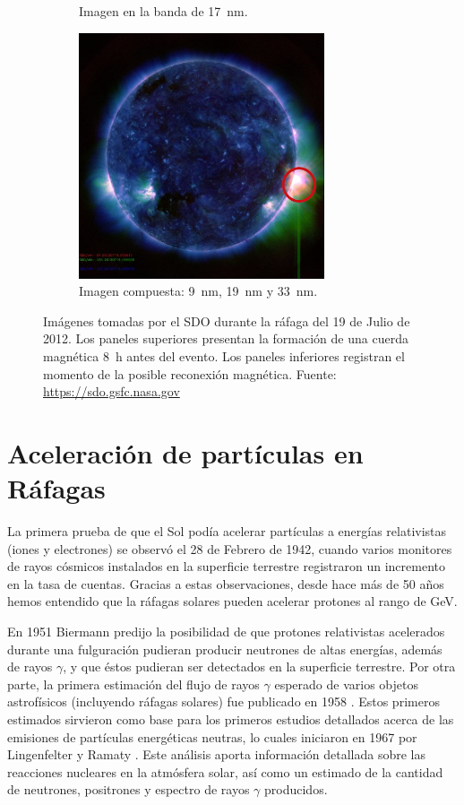 \begin{figure}
\begin{subfigure}[b]{0.49\textwidth}
                \caption*{Imagen en la banda de \SI{17}{\nano\metre}.}
        \end{subfigure}
        \begin{subfigure}[b]{0.49\textwidth}
                \includegraphics[width=7.25cm]{sdo120719-0555-c}
                \caption*{Imagen compuesta: \SI{9}{\nano\metre}, \SI{19}{\nano\metre} y \SI{33}{\nano\metre}.}
        \end{subfigure}
        \caption{Imágenes tomadas por el SDO durante la ráfaga del \num{19} de Julio de \num{2012}. Los paneles superiores presentan la formación de una cuerda magnética \SI{8}{\hour} antes del evento. Los paneles inferiores registran el momento de la posible reconexión magnética. Fuente: \url{https://sdo.gsfc.nasa.gov}}
        \label{fig:flare-euv}
\end{figure}

\section{Aceleración de partículas en Ráfagas}
\label{sec:acel-part}

La primera prueba de que el Sol podía acelerar partículas a energías relativistas (iones y electrones) se observó el \num{28} de Febrero de \num{1942}, cuando varios monitores de rayos cósmicos instalados en la superficie terrestre registraron un incremento en la tasa de cuentas. Gracias a estas observaciones, desde hace más de \num{50} años hemos entendido que la ráfagas solares pueden acelerar protones al rango de \si{\giga\electronvolt}.

En \num{1951} Biermann \cite{bierman51} predijo la posibilidad de que protones relativistas acelerados durante una fulguración pudieran producir neutrones de altas energías, además de rayos $\gamma$, y que éstos pudieran ser detectados en la superficie terrestre. Por otra parte, la primera estimación del flujo de rayos $\gamma$ esperado de varios objetos astrofísicos (incluyendo ráfagas solares) fue publicado en \num{1958} \cite{morrison58}. Estos primeros estimados sirvieron como base para los primeros estudios detallados acerca de las emisiones de partículas energéticas neutras, lo cuales iniciaron en \num{1967} por Lingenfelter y Ramaty \cite{lingen67}. Este análisis aporta información detallada sobre las reacciones nucleares en la atmósfera solar, así como un estimado de la cantidad de neutrones, positrones y espectro de rayos $\gamma$ producidos.

